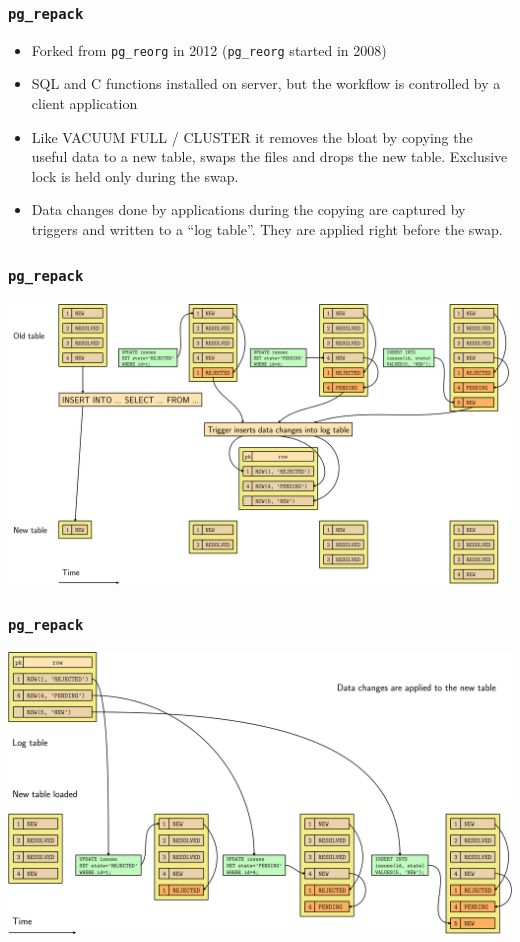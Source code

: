 \begin{frame}
	\frametitle{\texttt{pg\_repack}}
  \begin{itemize}
    \item Forked from \texttt{pg\_reorg} in 2012 (\texttt{pg\_reorg} started
      in 2008)
    \item SQL and C functions installed on server, but the workflow is
      controlled by a client application
    \item Like VACUUM FULL / CLUSTER it removes the bloat by copying the
      useful data to a new table, swaps the files and drops the new
      table. Exclusive lock is held only during the swap.
    \item Data changes done by applications during the copying are captured by
      triggers and written to a ``log table''. They are applied right before
      the swap.
  \end{itemize}
\end{frame}

\begin{frame}
  \frametitle{\texttt{pg\_repack}}
  \begin{center}
\includegraphics[height=\sizeforimages\textheight]{images/pg_repack_01.png}
  \end{center}
\end{frame}

\begin{frame}
  \frametitle{\texttt{pg\_repack}}
  \begin{center}
\includegraphics[height=\sizeforimages\textheight]{images/pg_repack_02.png}
  \end{center}
\end{frame}

